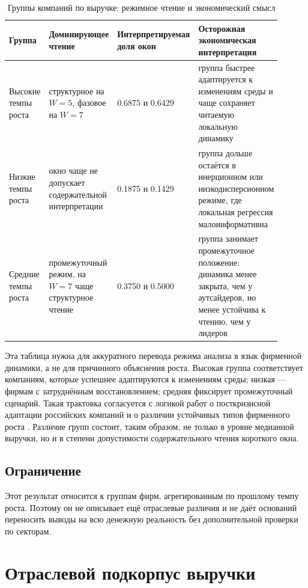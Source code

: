 \begin{table}[htbp]
\centering
\caption{Группы компаний по выручке: режимное чтение и экономический смысл}
\label{tab:b1-groups-economic-meaning}
\begin{tabular}{p{0.2\linewidth}p{0.22\linewidth}p{0.23\linewidth}p{0.25\linewidth}}
\toprule
Группа & Доминирующее чтение & Интерпретируемая доля окон & Осторожная экономическая интерпретация \\
\midrule
Высокие темпы роста & структурное на \(W=5\), фазовое на \(W=7\) & 0.6875 и 0.6429 & группа быстрее адаптируется к изменениям среды и чаще сохраняет читаемую локальную динамику \\
Низкие темпы роста & окно чаще не допускает содержательной интерпретации & 0.1875 и 0.1429 & группа дольше остаётся в инерционном или низкодисперсионном режиме, где локальная регрессия малоинформативна \\
Средние темпы роста & промежуточный режим, на \(W=7\) чаще структурное чтение & 0.3750 и 0.5000 & группа занимает промежуточное положение: динамика менее закрыта, чем у аутсайдеров, но менее устойчива к чтению, чем у лидеров \\
\bottomrule
\end{tabular}
\end{table}

Эта таблица нужна для аккуратного перевода режима анализа в язык фирменной динамики, а не для причинного объяснения роста. Высокая группа соответствует компаниям, которые успешнее адаптируются к изменениям среды; низкая --- фирмам с затруднённым восстановлением; средняя фиксирует промежуточный сценарий. Такая трактовка согласуется с логикой работ о посткризисной адаптации российских компаний и о различии устойчивых типов фирменного роста \cite{polunin-yudanov-2020,medovnikov,baranova-yudanov}. Различие групп состоит, таким образом, не только в уровне медианной выручки, но и в степени допустимости содержательного чтения короткого окна.

\subsection{Ограничение}
\label{sec:ogranichenie}

Этот результат относится к группам фирм, агрегированным по прошлому темпу роста. Поэтому он не описывает ещё отраслевые различия и не даёт оснований переносить выводы на всю денежную реальность без дополнительной проверки по секторам.

\section{Отраслевой подкорпус выручки}
\label{sec:otraslevoi-podkorpus-vyruchki}

